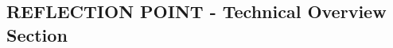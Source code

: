 \documentclass{l3proj}
\begin{document}







\subsection{REFLECTION POINT - Technical Overview Section}
\label{sec:techoverviewreflection}
\end{document}
